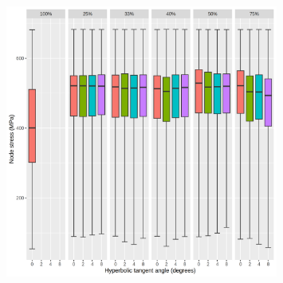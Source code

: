 \documentclass[../main.tex]{subfiles}
\begin{document}
\begin{figure}[h!]
  \centering
  \includegraphics[width=0.8\textwidth]{images/results/plots/femoral/stress/boxplots.png}
\end{figure}
\end{document}

